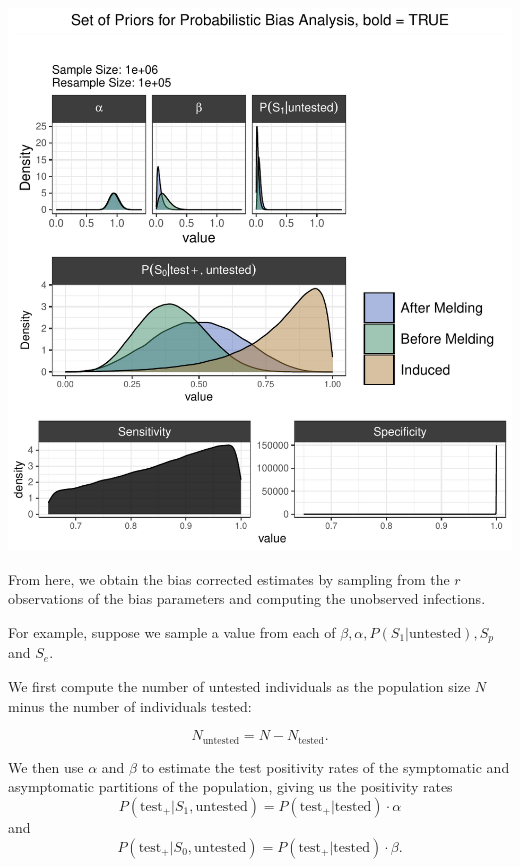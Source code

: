 \documentclass[12pt,twoside]{smiththesis}
\begin{document}
\includegraphics[width=1\linewidth]{thesis_files/figure-latex/unnamed-chunk-66-1}

From here, we obtain the bias corrected estimates by sampling from the \(r\) observations of the bias parameters and computing the unobserved infections.

For example, suppose we sample a value from each of \(\beta,\alpha,P(S_1|\text{untested}), S_p\) and \(S_e\).

We first compute the number of untested individuals as the population size \(N\) minus the number of individuals tested:

\[ N_{\text{untested}} =  N - N_{\text{tested}} .\]

We then use \(\alpha\) and \(\beta\) to estimate the test positivity rates of the symptomatic and asymptomatic partitions of the population, giving us the positivity rates
\[ P( \text{test}_+ | S_1, \text{untested})  = P( \text{test}_+ | \text{tested}) \cdot  \alpha  \]
and
\[ P( \text{test}_+ | S_0, \text{untested})  = P( \text{test}_+ | \text{tested}) \cdot  \beta. \]
\end{document}
